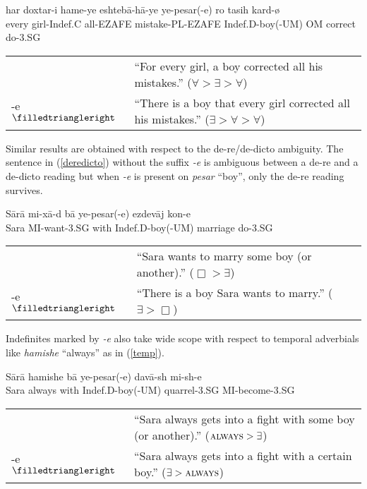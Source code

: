 \documentclass [11pt] {article}
\begin{document}
	\begin {exe}
		\ex \label {intermed} \gll	har	doxtar-i	hame-ye		eshteb\={a}-h\={a}-ye	ye-pesar({\color {blue}-e})	ro		tasih	kard-\o\\
			every	girl-{\scriptsize Indef.C} 	all-{\scriptsize EZAFE}		mistake-{\scriptsize PL}-{\scriptsize EZAFE}	{\scriptsize Indef.D}-boy({\scriptsize-UM})	{\scriptsize OM}	correct	do{\scriptsize -3.SG}\\
			\begin {tabular} {l l}
			& ``For every girl, a boy corrected all his mistakes.'' ($\forall > \exists > \forall$)\\
			{\color {blue}-e} $\filledtriangleright$ & ``There is a boy that every girl corrected all his mistakes.'' ($\exists > \forall > \forall$)\\
			\end {tabular}
	\end {exe}

Similar results are obtained with respect to the de-re/de-dicto ambiguity. The sentence in (\ref{deredicto}) without the suffix \emph{-e} is ambiguous between a de-re and a de-dicto reading but when \emph{-e} is present on \emph{pesar} ``boy'', only the de-re reading survives.

	\begin {exe}
		\ex \label{deredicto} \gll	S\={a}r\={a}	mi-x\={a}-d	b\={a}	ye-pesar({\color {blue}-e})		ezdev\={a}j	kon-e\\
				Sara	{\scriptsize MI-}want{\scriptsize -3.SG} 	with		{\scriptsize Indef.D}-boy({\scriptsize -UM})	marriage	do{\scriptsize -3.SG}\\
			\begin {tabular} {l l}
			& ``Sara wants to marry some boy (or another).'' ($\Box > \exists $)\\
			{\color {blue}-e} $\filledtriangleright$ & ``There is a boy Sara wants to marry.'' ($\exists > \Box $)\\
			\end {tabular}
	\end {exe}

Indefinites marked by \emph{-e} also take wide scope with respect to temporal adverbials like \emph{hamishe} ``always'' as in (\ref{temp}).

	\begin {exe}
		\ex \label {temp} \gll	S\={a}r\={a}	hamishe		b\={a}	ye-pesar({\color {blue}-e})		dav\={a}-sh	mi-sh-e\\
				Sara	always 	with		{\scriptsize Indef.D}-boy({\scriptsize -UM})	quarrel{\scriptsize -3.SG}	{\scriptsize MI-}become{\scriptsize -3.SG}\\
			\begin {tabular} {l l}
			& ``Sara always gets into a fight with some boy (or another).'' ($\textsc{always} > \exists $)\\
			{\color {blue}-e} $\filledtriangleright$ & ``Sara always gets into a fight with a certain boy.'' ($\exists > \textsc{always}$)\\
			\end {tabular}
	\end {exe}
\end{document}
